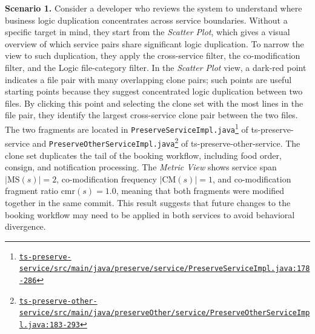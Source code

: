 \documentclass[conference]{IEEEtran}
\newcommand{\repo}{https://github.com/FudanSELab/train-ticket/blob/813dd01/}
\newcommand{\src}[2]{\href{\repo#1}{\nolinkurl{#2}}}
\begin{document}
\smallskip\noindent\textbf{Scenario 1.}
Consider a developer who reviews the system to understand where
business logic duplication concentrates across service boundaries.
Without a specific target in mind, they start from the \emph{Scatter Plot},
which gives a visual overview of which service pairs share significant logic
duplication. To narrow the view to such duplication, they apply the
cross-service filter, the co-modification filter, and the Logic
file-category filter. In the \emph{Scatter Plot} view, a dark-red point indicates a file
pair with many overlapping clone pairs; such points are useful starting
points because they suggest concentrated logic duplication between two
files. By clicking this point and selecting the clone set with the most lines in the file pair, they identify the largest cross-service clone pair between the two files. 
The two fragments are located in
\texttt{PreserveServiceImpl.java}\footnote{\src{ts-preserve-service/src/main/java/preserve/service/PreserveServiceImpl.java\#L178-L286}{ts-preserve-service/src/main/java/preserve/service/PreserveServiceImpl.java:178-286}}
of \mbox{ts-preserve-service} and
\texttt{PreserveOtherServiceImpl.java}\footnote{\src{ts-preserve-other-service/src/main/java/preserveOther/service/PreserveOtherServiceImpl.java\#L183-L293}{ts-preserve-other-service/src/main/java/preserveOther/service/PreserveOtherServiceImpl.java:183-293}}
of \mbox{ts-preserve-other-service}.
The clone set duplicates the tail of the booking workflow, including
food order, consign, and notification processing. The \emph{Metric View} shows
service span $|\mathrm{MS}(s)| = 2$, co-modification frequency
$|\mathrm{CM}(s)| = 1$, and co-modification fragment ratio
$\mathrm{cmr}(s) = 1.0$, meaning that both fragments were modified
together in the same commit. This result suggests that future changes
to the booking workflow may need to be applied in both services to
avoid behavioral divergence.
\end{document}
